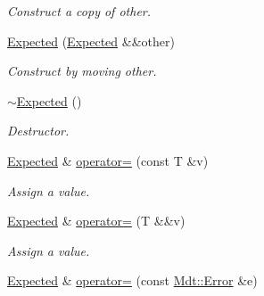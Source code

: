 \begin{DoxyCompactItemize}
\begin{DoxyCompactList}\small\item\em Construct a copy of other. \end{DoxyCompactList}\item 
\hyperlink{class_mdt_1_1_expected_a8d14f0fbfb0c4e1acbfbae539f797aa8}{Expected} (\hyperlink{class_mdt_1_1_expected}{Expected} \&\&other)\hypertarget{class_mdt_1_1_expected_a8d14f0fbfb0c4e1acbfbae539f797aa8}{}\label{class_mdt_1_1_expected_a8d14f0fbfb0c4e1acbfbae539f797aa8}

\begin{DoxyCompactList}\small\item\em Construct by moving other. \end{DoxyCompactList}\item 
\hyperlink{class_mdt_1_1_expected_ab3694955007f559c7f394e9883aa44a0}{$\sim$\+Expected} ()\hypertarget{class_mdt_1_1_expected_ab3694955007f559c7f394e9883aa44a0}{}\label{class_mdt_1_1_expected_ab3694955007f559c7f394e9883aa44a0}

\begin{DoxyCompactList}\small\item\em Destructor. \end{DoxyCompactList}\item 
\hyperlink{class_mdt_1_1_expected}{Expected} \& \hyperlink{class_mdt_1_1_expected_a9c7eb862d4d49f2160a16e32ec302e6c}{operator=} (const T \&v)\hypertarget{class_mdt_1_1_expected_a9c7eb862d4d49f2160a16e32ec302e6c}{}\label{class_mdt_1_1_expected_a9c7eb862d4d49f2160a16e32ec302e6c}

\begin{DoxyCompactList}\small\item\em Assign a value. \end{DoxyCompactList}\item 
\hyperlink{class_mdt_1_1_expected}{Expected} \& \hyperlink{class_mdt_1_1_expected_a7c1272621b28c6750f4a230278d477da}{operator=} (T \&\&v)\hypertarget{class_mdt_1_1_expected_a7c1272621b28c6750f4a230278d477da}{}\label{class_mdt_1_1_expected_a7c1272621b28c6750f4a230278d477da}

\begin{DoxyCompactList}\small\item\em Assign a value. \end{DoxyCompactList}\item 
\hyperlink{class_mdt_1_1_expected}{Expected} \& \hyperlink{class_mdt_1_1_expected_a60b7b4811399f71568fda6731a7afd59}{operator=} (const \hyperlink{class_mdt_1_1_error}{Mdt\+::\+Error} \&e)\hypertarget{class_mdt_1_1_expected_a60b7b4811399f71568fda6731a7afd59}{}\label{class_mdt_1_1_expected_a60b7b4811399f71568fda6731a7afd59}


\end{DoxyCompactItemize}
